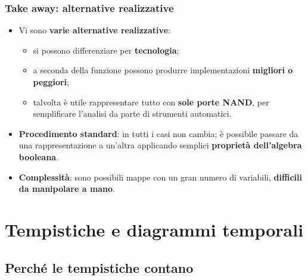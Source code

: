 \documentclass[12pt, a4paper]{article}
\newcounter{esercizio}[section]
\begin{document}
\subsubsection{Take away: alternative realizzative}
\begin{itemize}
    \item Vi sono \textbf{varie alternative realizzative}:
    \begin{itemize}
        \item si possono differenziare per \textbf{tecnologia};
        \item a seconda della funzione possono produrre implementazioni \textbf{migliori o peggiori};
        \item talvolta è utile rappresentare tutto con \textbf{sole porte NAND}, per semplificare l'analisi da parte di strumenti automatici.
    \end{itemize}
    \item \textbf{Procedimento standard}: in tutti i casi non cambia; è possibile passare da una rappresentazione a un'altra applicando semplici \textbf{proprietà dell'algebra booleana}.
    \item \textbf{Complessità}: sono possibili mappe con un gran numero di variabili, \textbf{difficili da manipolare a mano}.
\end{itemize}



\section{Tempistiche e diagrammi temporali}


\subsection{Perché le tempistiche contano}
\end{document}
